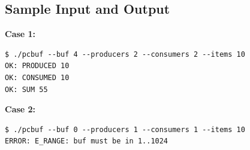 \subsection{Sample Input and Output}

\textbf{Case 1:}
\begin{verbatim}
$ ./pcbuf --buf 4 --producers 2 --consumers 2 --items 10
OK: PRODUCED 10
OK: CONSUMED 10
OK: SUM 55
\end{verbatim}

\textbf{Case 2:}
\begin{verbatim}
$ ./pcbuf --buf 0 --producers 1 --consumers 1 --items 10
ERROR: E_RANGE: buf must be in 1..1024
\end{verbatim}
